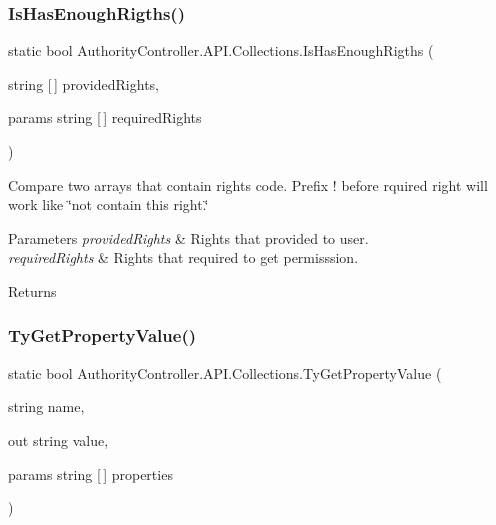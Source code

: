 \subsubsection{\texorpdfstring{Is\+Has\+Enough\+Rigths()}{IsHasEnoughRigths()}}
{\footnotesize\ttfamily static bool Authority\+Controller.\+A\+P\+I.\+Collections.\+Is\+Has\+Enough\+Rigths (\begin{DoxyParamCaption}\item[{string \mbox{[}$\,$\mbox{]}}]{provided\+Rights,  }\item[{params string \mbox{[}$\,$\mbox{]}}]{required\+Rights }\end{DoxyParamCaption})\hspace{0.3cm}{\ttfamily [static]}}



Compare two arrays that contain rights code. Prefix \textquotesingle{}!\textquotesingle{} before rquired right will work like \char`\"{}not contain this right.\char`\"{} 


\begin{DoxyParams}{Parameters}
{\em provided\+Rights} & Rights that provided to user.\\
\hline
{\em required\+Rights} & Rights that required to get permisssion.\\
\hline
\end{DoxyParams}
\begin{DoxyReturn}{Returns}

\end{DoxyReturn}
\mbox{\label{class_authority_controller_1_1_a_p_i_1_1_collections_a65e8bd3790cb8576d37938f20dd792f4}} 
\subsubsection{\texorpdfstring{Ty\+Get\+Property\+Value()}{TyGetPropertyValue()}}
{\footnotesize\ttfamily static bool Authority\+Controller.\+A\+P\+I.\+Collections.\+Ty\+Get\+Property\+Value (\begin{DoxyParamCaption}\item[{string}]{name,  }\item[{out string}]{value,  }\item[{params string \mbox{[}$\,$\mbox{]}}]{properties }\end{DoxyParamCaption})\hspace{0.3cm}{\ttfamily [static]}}



